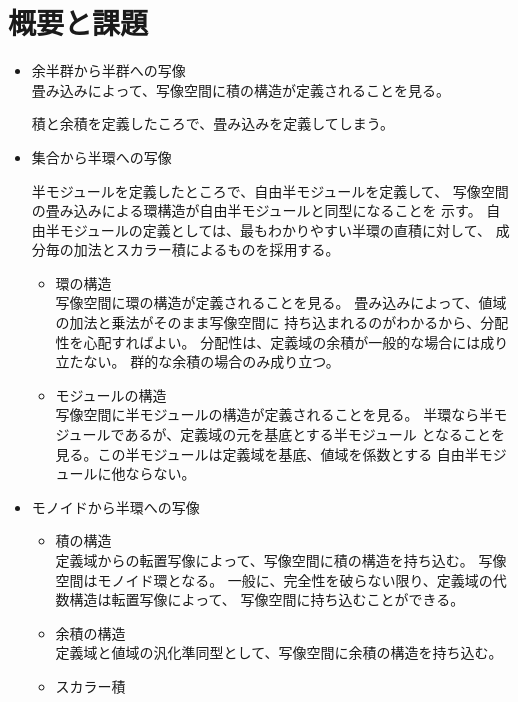 \section{概要と課題}\label{s1:概要と課題} %
	\begin{itemize}
		\item 余半群から半群への写像 \\
		畳み込みによって、写像空間に積の構造が定義されることを見る。
		\begin{todo}[代数へ移動]\label{todo:代数へ移動} %
			積と余積を定義したころで、畳み込みを定義してしまう。
		\end{todo} %
		\item 集合から半環への写像
		\begin{todo}[代数へ移動]\label{todo:代数へ移動} %
			半モジュールを定義したところで、自由半モジュールを定義して、
			写像空間の畳み込みによる環構造が自由半モジュールと同型になることを
			示す。
			自由半モジュールの定義としては、最もわかりやすい半環の直積に対して、
			成分毎の加法とスカラー積によるものを採用する。
		\end{todo} %
		\begin{itemize}
			\item 環の構造 \\
			写像空間に環の構造が定義されることを見る。
			畳み込みによって、値域の加法と乗法がそのまま写像空間に
			持ち込まれるのがわかるから、分配性を心配すればよい。
			分配性は、定義域の余積が一般的な場合には成り立たない。
			群的な余積の場合のみ成り立つ。
			\item モジュールの構造 \\
			写像空間に半モジュールの構造が定義されることを見る。
			半環なら半モジュールであるが、定義域の元を基底とする半モジュール
			となることを見る。この半モジュールは定義域を基底、値域を係数とする
			自由半モジュールに他ならない。
		\end{itemize}
		\item モノイドから半環への写像
		\begin{itemize}
			\item 積の構造 \\
			定義域からの転置写像によって、写像空間に積の構造を持ち込む。
			写像空間はモノイド環となる。
			一般に、完全性を破らない限り、定義域の代数構造は転置写像によって、
			写像空間に持ち込むことができる。
			\item 余積の構造 \\
			定義域と値域の汎化準同型として、写像空間に余積の構造を持ち込む。
			\item スカラー積 \\

\end{itemize}
\end{itemize}
